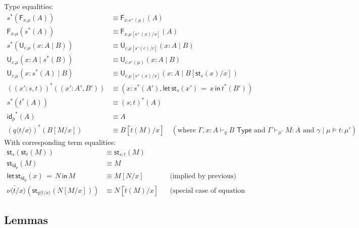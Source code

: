 \documentclass[10pt]{article}
\theoremstyle{definition}
\newcommand{\TYPE}{\,\,\mathsf{Type}}
\newcommand{\rewrite}[2]{\overleftarrow{#1}(#2)}
\newcommand\F[2]{\ensuremath{\mathsf{F}_{#1}(#2)}}
\newcommand\U[3]{\ensuremath{\mathsf{U}_{#1}(#2 \mid #3)}}
\newcommand\St[2]{\ensuremath{{#1}^*(#2)}}
\newcommand\StI[2]{\ensuremath{\mathsf{st}_{#1}(#2)}}
\newcommand\StE[4]{\ensuremath{\mathsf{let} \, \StI{#1}{#3} \, = \, {#2} \, \mathsf{in} \, #4}}
\newcommand\TermTwo[4]{\ensuremath{#1 \mid #3 \vDash #2 : #4}}
\newcommand\TrPlus[2]{\ensuremath{{#1}^+(#2)}}
\newcommand\TrCirc[2]{\ensuremath{{#1}^\circ(#2)}}
\newcommand{\id}{\mathsf{id}}
\newcommand\ap[2]{\ensuremath{#1 \langle #2 \rangle }}
\newcommand{\telety}[3]{\ensuremath{(#1{:}#2,#3)}}
\begin{document}
Type equalities:
\begin{align*}
\St{s}{\F{x.\mu}{A}} &\equiv \F{x.\TrPlus{s}{\mu}}{A} \\
\F{x.\mu}{\St{s}{A}} &\equiv \F{x.\mu[\TrPlus{s}{x}/x]}{A} \\
\St{s}{\U{c.\mu}{x:A}{B}} &\equiv \U{c.\mu[\TrCirc{s}{c}/c]}{x:A}{B} \\
\U{c.\mu}{x:A}{\St{s}{B}} &\equiv \U{c.\TrCirc{s}{\mu}}{x:A}{B} \\
\U{c.\mu}{x:\St{s}{A}}{B} &\equiv \U{c.\mu[\TrPlus{s}{x}/x]}{x:A}{B[\StI{s}{x}/x]} \\
\St{(\telety{x'}{s}{t})}{\telety{x'}{A'}{B'}} & \equiv \telety{x}{\St{s}{A'}}{\StE{s}{x}{x'}{\St{t}{B'}}} \\
\St{s}{\St{t}{A}} &\equiv \St{(s;t)}{A} \\
\St{\id_p}{A} &\equiv A\\
\St{(\ap{q}{t/x})}{B[M/x]} & \equiv B[\rewrite{t}{M}/x] \quad (\text{where }
\Gamma,x:A \vdash_q B \TYPE \text{ and } \Gamma \vdash_{\mu'} M : A \text{ and }
\TermTwo{\gamma}{t}{\mu}{\mu'})
\end{align*}
With corresponding term equalities: 
\begin{align*}
\StI{s}{\StI{t}{M}} &\equiv \StI{s;t}{M} \\
\StI{\id_p}{M} &\equiv M \\
\StE{\id_p}{N}{x}{M} &\equiv M[N/x] && \text{(implied by previous)}\\
\rewrite{\ap{\nu}{t/x}}{\StI{\ap{q}{t/x}}{N[M/x]}} &\equiv N[\rewrite{t}{M}/x]  && \text{(special case of equation for 2cell on substitutions)}
\end{align*}


\subsection{Lemmas}
\end{document}
